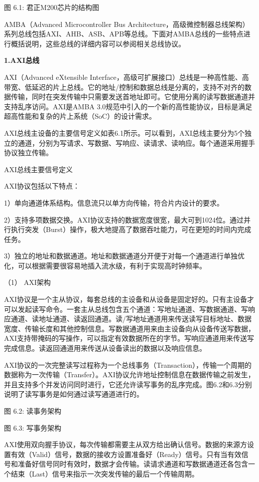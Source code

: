 \documentclass[]{ctexbook}
\begin{document}
图 6.1: 君正M200芯片的结构图

AMBA（Advanced Microcontroller Bus Architecture，高级微控制器总线架构）系列总线包括AXI、AHB、ASB、APB等总线。下面对AMBA总线的一些特点进行概括说明，这些总线的详细内容可以参阅相关总线协议。

\textbf{1.AXI总线}

AXI（Advanced eXtensible Interface，高级可扩展接口）总线是一种高性能、高带宽、低延迟的片上总线。它的地址/控制和数据总线是分离的，支持不对齐的数据传输，同时在突发传输中只需要发送首地址即可。它使用分离的读写数据通道并支持乱序访问。AXI是AMBA 3.0规范中引入的一个新的高性能协议，目标是满足超高性能和复杂的片上系统（SoC）的设计需求。

AXI总线主设备的主要信号定义如表6.1所示。可以看到，AXI总线主要分为5个独立的通道，分别为写请求、写数据、写响应、读请求、读响应。每个通道采用握手协议独立传输。

\label{tab:axi}AXI总线主要信号定义

AXI协议包括以下特点：

1）单向通道体系结构。信息流只以单方向传输，符合片内设计的要求。

2）支持多项数据交换。AXI协议支持的数据宽度很宽，最大可到1024位。通过并行执行突发（Burst）操作，极大地提高了数据吞吐能力，可在更短的时间内完成任务。

3）独立的地址和数据通道。地址和数据通道分开便于对每一个通道进行单独优化，可以根据需要很容易地插入流水级，有利于实现高时钟频率。

（1） AXI架构

AXI协议是一个主从协议，每套总线的主设备和从设备是固定好的。只有主设备才可以发起读写命令。一套主从总线包含五个通道：写地址通道、写数据通道、写响应通道、读地址通道、读返回通道。读/写地址通道用来传送读写目标地址、数据宽度、传输长度和其他控制信息。写数据通道用来由主设备向从设备传送写数据，AXI支持带掩码的写操作，可以指定有效数据所在的字节。写响应通道用来传送写完成信息。读返回通道用来传送从设备读出的数据以及响应信息。

AXI协议的一次完整读写过程称为一个总线事务（Transaction），传输一个周期的数据称为一次传输（Transfer）。AXI协议允许地址控制信息在数据传输之前发生，并且支持多个并发访问同时进行，它还允许读写事务的乱序完成。图6.2和6.3分别说明了读写事务是如何通过读写通道进行的。

图 6.2: 读事务架构

图 6.3: 写事务架构

AXI使用双向握手协议，每次传输都需要主从双方给出确认信号。数据的来源方设置有效（Valid）信号，数据的接收方设置准备好（Ready）信号。只有当有效信号和准备好信号同时有效时，数据才会传输。读请求通道和写数据通道还各包含一个结束（Last）信号来指示一次突发传输的最后一个传输周期。
\end{document}
